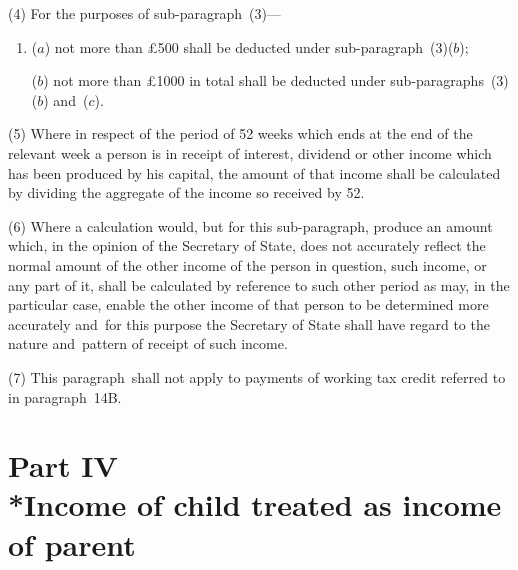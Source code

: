 \documentclass[12pt,a4paper]{article}
\begin{document}
(4) For the purposes of sub-paragraph~(3)—
\begin{enumerate}\item[]
($a$) not more than £500 shall be deducted under sub-paragraph~(3)($b$);

\begin{sloppypar}
($b$) not more than £1000 in total shall be deducted under sub-\hspace{0pt}paragraphs~(3)($b$) and~($c$).
\end{sloppypar}
\end{enumerate}

(5) Where in respect of the period of 52 weeks which ends at the end of the relevant week a person is in receipt of interest, dividend or other income which has been produced by his capital, the amount of that income shall be calculated by dividing the aggregate of the income so received by 52.

(6) Where a calculation would, but for this sub-paragraph, produce an amount which, in the opinion of the 
Secretary of State,  %
does not accurately reflect the normal amount of the other income of the person in question, such income, or any part of it, shall be calculated by reference to such other period as may, in the particular case, enable the other income of that person to be determined more accurately and~for this purpose the 
Secretary of State  %
shall have regard to the nature and~pattern of receipt of such income.

(7) This paragraph~shall not apply to payments of working tax credit referred to in paragraph~14B.


\section[Part IV --- Income of child treated as income of parent]{Part IV\\*Income of child treated as income of parent}
\end{document}
